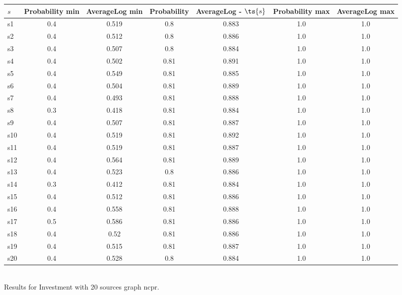 \documentclass{article}
\begin{document}
\noindent\begin{tabular}{|l|c|c|c|c|c|c|}
\hline
$s$& Probability min & AverageLog min & Probability & AverageLog - $\ts{s}$ & Probability max & AverageLog max\\
\hline
s1 &0.4 & 0.519 & 0.8 & 0.883 & 1.0 & 1.0\\
\hline
s2 &0.4 & 0.512 & 0.8 & 0.886 & 1.0 & 1.0\\
\hline
s3 &0.4 & 0.507 & 0.8 & 0.884 & 1.0 & 1.0\\
\hline
s4 &0.4 & 0.502 & 0.81 & 0.891 & 1.0 & 1.0\\
\hline
s5 &0.4 & 0.549 & 0.81 & 0.885 & 1.0 & 1.0\\
\hline
s6 &0.4 & 0.504 & 0.81 & 0.889 & 1.0 & 1.0\\
\hline
s7 &0.4 & 0.493 & 0.81 & 0.888 & 1.0 & 1.0\\
\hline
s8 &0.3 & 0.418 & 0.81 & 0.884 & 1.0 & 1.0\\
\hline
s9 &0.4 & 0.507 & 0.81 & 0.887 & 1.0 & 1.0\\
\hline
s10 &0.4 & 0.519 & 0.81 & 0.892 & 1.0 & 1.0\\
\hline
s11 &0.4 & 0.519 & 0.81 & 0.887 & 1.0 & 1.0\\
\hline
s12 &0.4 & 0.564 & 0.81 & 0.889 & 1.0 & 1.0\\
\hline
s13 &0.4 & 0.523 & 0.8 & 0.886 & 1.0 & 1.0\\
\hline
s14 &0.3 & 0.412 & 0.81 & 0.884 & 1.0 & 1.0\\
\hline
s15 &0.4 & 0.512 & 0.81 & 0.886 & 1.0 & 1.0\\
\hline
s16 &0.4 & 0.558 & 0.81 & 0.888 & 1.0 & 1.0\\
\hline
s17 &0.5 & 0.586 & 0.81 & 0.886 & 1.0 & 1.0\\
\hline
s18 &0.4 & 0.52 & 0.81 & 0.886 & 1.0 & 1.0\\
\hline
s19 &0.4 & 0.515 & 0.81 & 0.887 & 1.0 & 1.0\\
\hline
s20 &0.4 & 0.528 & 0.8 & 0.884 & 1.0 & 1.0\\
\hline
\end{tabular}\\

\noindent Results for Investment with 20 sources graph ncpr.
\end{document}
